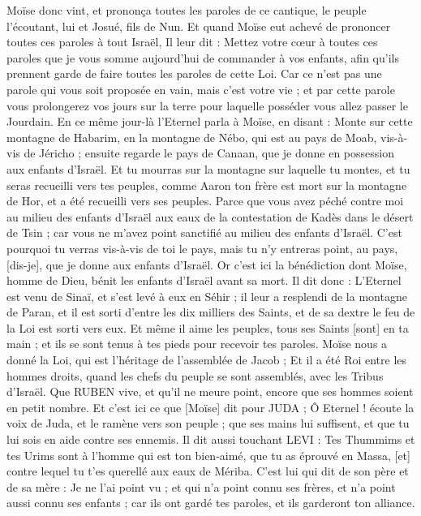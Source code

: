 \begin{multicols}{2}
Moïse donc vint, et prononça toutes les paroles de ce cantique, le peuple l'écoutant, lui et Josué, fils de Nun.
Et quand Moïse eut achevé de prononcer toutes ces paroles à tout Israël,
Il leur dit : Mettez votre cœur à toutes ces paroles que je vous somme aujourd'hui de commander à vos enfants, afin qu'ils prennent garde de faire toutes les paroles de cette Loi.
Car ce n'est pas une parole qui vous soit proposée en vain, mais c'est votre vie ; et par cette parole vous prolongerez vos jours sur la terre pour laquelle posséder vous allez passer le Jourdain.
En ce même jour-là l'Eternel parla à Moïse, en disant :
Monte sur cette montagne de Habarim, en la montagne de Nébo, qui est au pays de Moab, vis-à-vis de Jéricho ; ensuite regarde le pays de Canaan, que je donne en possession aux enfants d'Israël.
Et tu mourras sur la montagne sur laquelle tu montes, et tu seras recueilli vers tes peuples, comme Aaron ton frère est mort sur la montagne de Hor, et a été recueilli vers ses peuples.
Parce que vous avez péché contre moi au milieu des enfants d'Israël aux eaux de la contestation de Kadès dans le désert de Tsin ; car vous ne m'avez point sanctifié au milieu des enfants d'Israël.
C'est pourquoi tu verras vis-à-vis de toi le pays, mais tu n'y entreras point, au pays, [dis-je], que je donne aux enfants d'Israël.
\VerseOne{}Or c'est ici la bénédiction dont Moïse, homme de Dieu, bénit les enfants d'Israël avant sa mort.
Il dit donc : L'Eternel est venu de Sinaï, et s'est levé à eux en Séhir ; il leur a resplendi de la montagne de Paran, et il est sorti d'entre les dix milliers des Saints, et de sa dextre le feu de la Loi est sorti vers eux.
Et même il aime les peuples, tous ses Saints [sont] en ta main ; et ils se sont tenus à tes pieds pour recevoir tes paroles.
Moïse nous a donné la Loi, qui est l'héritage de l'assemblée de Jacob ;
Et il a été Roi entre les hommes droits, quand les chefs du peuple se sont assemblés, avec les Tribus d'Israël.
Que RUBEN vive, et qu'il ne meure point, encore que ses hommes soient en petit nombre.
Et c'est ici ce que [Moïse] dit pour JUDA ; Ô Eternel ! écoute la voix de Juda, et le ramène vers son peuple ; que ses mains lui suffisent, et que tu lui sois en aide contre ses ennemis.
Il dit aussi touchant LEVI : Tes Thummims et tes Urims sont à l'homme qui est ton bien-aimé, que tu as éprouvé en Massa, [et] contre lequel tu t'es querellé aux eaux de Mériba.
C'est lui qui dit de son père et de sa mère : Je ne l'ai point vu ; et qui n'a point connu ses frères, et n'a point aussi connu ses enfants ; car ils ont gardé tes paroles, et ils garderont ton alliance.

\end{multicols}
